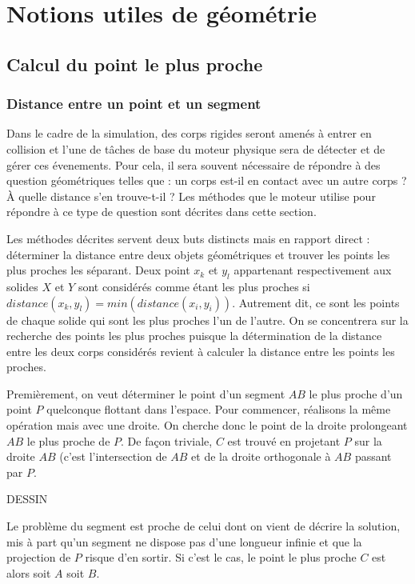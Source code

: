\documentclass[twocolumn]{article}
\begin{document}
\section{Notions utiles de géométrie}

\subsection{Calcul du point le plus proche}

\subsubsection{Distance entre un point et un segment}

Dans le cadre de la simulation, des corps rigides seront amenés à entrer en collision et l'une de tâches de base du moteur physique sera de détecter et de gérer ces évenements. Pour cela, il sera souvent nécessaire de répondre à des question géométriques telles que : un corps est-il en contact avec un autre corps ? \`A quelle distance s'en trouve-t-il ? Les méthodes que le moteur utilise pour répondre à ce type de question sont décrites dans cette section.

Les méthodes décrites servent deux buts distincts mais en rapport direct : déterminer la distance entre deux objets géométriques et trouver les points les plus proches les séparant. Deux point $x_k$ et $y_l$ appartenant respectivement aux solides $X$ et $Y$ sont considérés comme étant les plus proches si $distance(x_k,y_l) = min(distance(x_i, y_i))$. Autrement dit, ce sont les points de chaque solide qui sont les plus proches l'un de l'autre. On se concentrera sur la recherche des points les plus proches puisque la détermination de la distance entre les deux corps considérés revient à calculer la distance entre les points les proches.

Premièrement, on veut déterminer le point d'un segment $AB$ le plus proche d'un point $P$ quelconque flottant dans l'espace. Pour commencer, réalisons la même opération mais avec une droite. On cherche donc le point de la droite prolongeant $AB$ le plus proche de $P$. De façon triviale, $C$ est trouvé en projetant $P$ sur la droite $AB$ (c'est l'intersection de $AB$ et de la droite orthogonale à $AB$ passant par $P$.

DESSIN

Le problème du segment est proche de celui dont on vient de décrire la solution, mis à part qu'un segment ne dispose pas d'une longueur infinie et que la projection de $P$ risque d'en sortir. Si c'est le cas, le point le plus proche $C$ est alors soit $A$ soit $B$.
\end{document}
